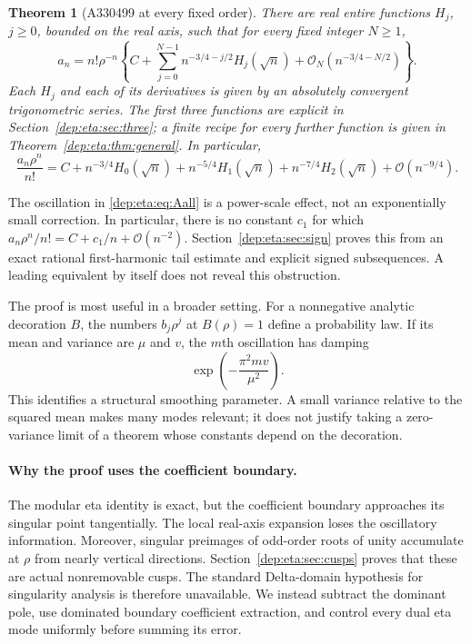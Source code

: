 \documentclass[11pt]{article}
\newtheorem{theorem}{Theorem}[section]
\theoremstyle{definition}\newtheorem{definition}[theorem]{Definition}
\theoremstyle{remark}\newtheorem{remark}[theorem]{Remark}
\newcommand{\OO}{\mathcal O}
\begin{document}
\begin{theorem}[A330499 at every fixed order]\label{dep:eta:thm:A}
There are real entire functions $H_j$, $j\ge0$, bounded on the real axis,
such that for every fixed integer $N\ge1$,
\begin{equation}\label{dep:eta:eq:Aall}
 a_n=n!\rho^{-n}\left\{C+
       \sum_{j=0}^{N-1}n^{-3/4-j/2}H_j(\sqrt n)
       +\OO_N(n^{-3/4-N/2})\right\}.
\end{equation}
Each $H_j$ and each of its derivatives is given by an absolutely
convergent trigonometric series. The first three functions are explicit
in Section~\ref{dep:eta:sec:three}; a finite recipe for every further function
is given in Theorem~\ref{dep:eta:thm:general}. In particular,
\begin{equation}\label{dep:eta:eq:threeintro}
 \frac{a_n\rho^n}{n!}=C+n^{-3/4}H_0(\sqrt n)
        +n^{-5/4}H_1(\sqrt n)+n^{-7/4}H_2(\sqrt n)
        +\OO(n^{-9/4}).
\end{equation}
\end{theorem}

The oscillation in \eqref{dep:eta:eq:Aall} is a power-scale effect, not an
exponentially small correction. In particular, there is no constant
$c_1$ for which $a_n\rho^n/n!=C+c_1/n+\OO(n^{-2})$.
Section~\ref{dep:eta:sec:sign} proves this from an exact rational first-harmonic
tail estimate and explicit signed subsequences. A leading equivalent
by itself does not reveal this obstruction.

The proof is most useful in a broader setting. For a nonnegative
analytic decoration $B$, the numbers $b_j\rho^j$ at $B(\rho)=1$ define
a probability law. If its mean and variance are $\mu$ and $v$, the
$m$th oscillation has damping
\begin{equation}\label{dep:eta:eq:damping}
 \exp\left(-\frac{\pi^2mv}{\mu^2}\right).
\end{equation}
This identifies a structural smoothing parameter. A small variance
relative to the squared mean makes many modes relevant; it does not
justify taking a zero-variance limit of a theorem whose constants depend
on the decoration.

\paragraph{Why the proof uses the coefficient boundary.}
The modular eta identity is exact, but the coefficient boundary
approaches its singular point tangentially. The local real-axis
expansion loses the oscillatory information. Moreover, singular
preimages of odd-order roots of unity accumulate at $\rho$ from
nearly vertical directions. Section~\ref{dep:eta:sec:cusps} proves that these
are actual nonremovable cusps. The standard Delta-domain hypothesis
for singularity analysis is therefore unavailable. We instead subtract
the dominant pole, use dominated boundary coefficient extraction, and
control every dual eta mode uniformly before summing its error.
\end{document}
